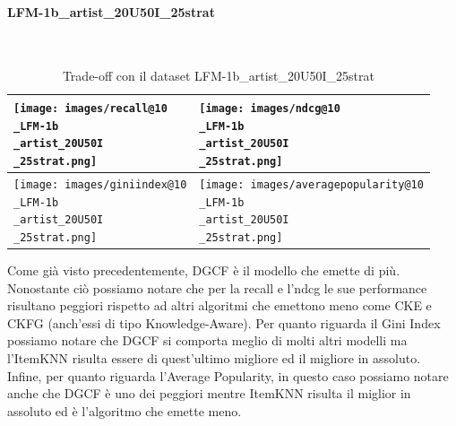 \paragraph{LFM-1b\_artist\_20U50I\_25strat} \textcolor{white}{.} \\
\begin{table}[H]
    \centering
    \footnotesize
    \setlength\tabcolsep{0pt}
    \begin{tabularx}{\textwidth}{|X|X|}
        \hline
        \texttt{[image: images/recall@10\\\_LFM-1b\\\_artist\_20U50I\\\_25strat.png]} &
        \texttt{[image: images/ndcg@10\\\_LFM-1b\\\_artist\_20U50I\\\_25strat.png]} \\
        \hline
        \texttt{[image: images/giniindex@10\\\_LFM-1b\\\_artist\_20U50I\\\_25strat.png]} &
        \texttt{[image: images/averagepopularity@10\\\_LFM-1b\\\_artist\_20U50I\\\_25strat.png]} \\
        \hline
    \end{tabularx}
    \caption{Trade-off con il dataset LFM-1b\_artist\_20U50I\_25strat}
    \label{tab:emissions_info}
\end{table}

\noindent Come già visto precedentemente, DGCF è il modello che emette di più. Nonostante ciò possiamo notare che per la recall e l'ndcg le sue performance risultano peggiori rispetto ad altri algoritmi che emettono meno come CKE e CKFG (anch'essi di tipo Knowledge-Aware).
Per quanto riguarda il Gini Index possiamo notare che DGCF si comporta meglio di molti altri modelli ma l'ItemKNN risulta essere di quest'ultimo migliore ed il migliore in assoluto.
Infine, per quanto riguarda l'Average Popularity, in questo caso possiamo notare anche che DGCF è uno dei peggiori mentre ItemKNN risulta il miglior in assoluto ed è l'algoritmo che emette meno.

